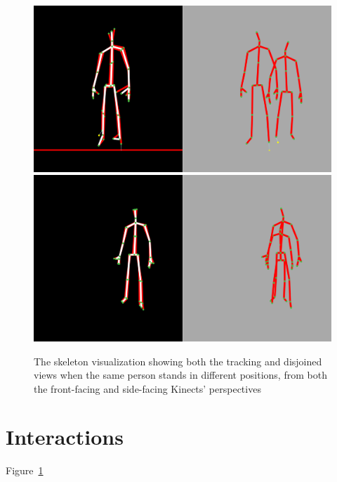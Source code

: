 \begin{figure}[!h]
{    \includegraphics[width=0.33\linewidth]{figs/obstacle_8}
    \includegraphics[width=0.33\linewidth]{figs/obstacle_9}
  }

  \caption{The skeleton visualization showing both the tracking and disjoined views when the same person stands in different positions, from both the front-facing and side-facing Kinects' perspectives}
  
  \label{fig:results_obstacle_timeline}
\end{figure}

\section{Interactions}
\label{sec:results_interactions}

Figure~\ref{fig:results_obstacle_timeline}

